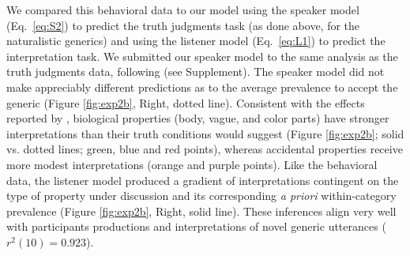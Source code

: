 \documentclass[10pt,letterpaper]{article}
\begin{document}
We compared this behavioral data to our model using the speaker model (Eq.~\ref{eq:S2}) to predict the truth judgments task (as done above, for the naturalistic generics) and using the listener model (Eq.~\ref{eq:L1}) to predict the interpretation task. 
We submitted our speaker model to the same analysis as the truth judgments data, following  (see Supplement). 
The speaker model did not make appreciably different predictions as to the average prevalence to accept the generic (Figure \ref{fig:exp2b}, Right, dotted line). 
Consistent with the effects reported by , biological properties (body, vague, and color parts) have stronger interpretations than their truth conditions would suggest (Figure \ref{fig:exp2b}; solid vs. dotted lines; green, blue and red points), whereas accidental properties receive more modest interpretations (orange and purple points).
Like the behavioral data, the listener model produced a gradient of interpretations contingent on the type of property under discussion and its corresponding \emph{a priori} within-category prevalence (Figure \ref{fig:exp2b}, Right, solid line). 
These inferences align very well with participants productions and interpretations of novel generic utterances ($r^2(10) = 0.923$). 

%
\end{document}
